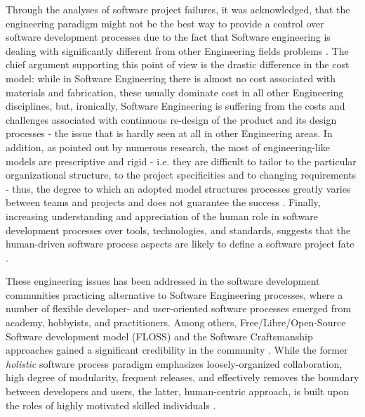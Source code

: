 Through the analyses of software project failures, it was acknowledged, that the engineering 
paradigm might not be the best way to provide a control over software development processes 
due to the fact that Software engineering is dealing with significantly different from other 
Engineering fields problems \cite{citeulike:3729379} \cite{citeulike:5203446} \cite{citeulike:2207657}.
The chief argument supporting this point of view is the drastic difference in the cost model:
while in Software Engineering there is almost no cost associated with materials and 
fabrication, these usually dominate cost in all other Engineering disciplines, but, 
ironically, Software Engineering is suffering from the costs and challenges associated with 
continuous re-design of the product and its design processes - the issue that is 
hardly seen at all in other Engineering areas. 
In addition, as pointed out by numerous research, the most of engineering-like models are 
prescriptive and rigid - i.e. they are difficult to tailor to the particular organizational structure,
to the project specificities and to changing requirements - thus, the degree to which an adopted model 
structures processes greatly varies between teams and projects and does not guarantee the success \cite{sacchi_2001}. 
Finally, increasing understanding and appreciation of the human role in software development 
processes over tools, technologies, and standards, suggests that the human-driven software process 
aspects are likely to define a software project fate \cite{citeulike:6580825} \cite{citeulike:149387} 
\cite{1605185} \cite{citeulike:113403} \cite{citeulike:12743107}. 

These engineering issues has been addressed in the software development communities practicing 
alternative to Software Engineering processes, where a number of flexible developer- and user-oriented 
software processes emerged from academy, hobbyists, and practitioners.
Among others, Free/Libre/Open-Source Software development model (FLOSS) and the 
Software Craftsmanship  approaches gained a significant credibility in the community \cite{citeulike:3729379}. 
While the former \textit{holistic} software process paradigm emphasizes loosely-organized 
collaboration, high degree of modularity, frequent releases, and effectively removes the boundary 
between developers and users, the latter, human-centric approach, is built upon the roles of highly 
motivated skilled individuals \cite{citeulike:262020} \cite{citeulike:2759198}. 

